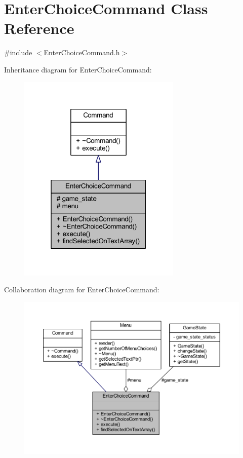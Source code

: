 \hypertarget{class_enter_choice_command}{}\section{Enter\+Choice\+Command Class Reference}
\label{class_enter_choice_command}


{\ttfamily \#include $<$Enter\+Choice\+Command.\+h$>$}



Inheritance diagram for Enter\+Choice\+Command\+:
\nopagebreak
\begin{figure}[H]
\begin{center}
\leavevmode
\includegraphics[width=220pt]{class_enter_choice_command__inherit__graph}
\end{center}
\end{figure}


Collaboration diagram for Enter\+Choice\+Command\+:
\nopagebreak
\begin{figure}[H]
\begin{center}
\leavevmode
\includegraphics[width=350pt]{class_enter_choice_command__coll__graph}
\end{center}
\end{figure}
